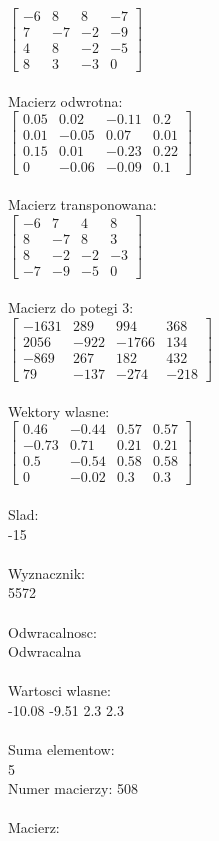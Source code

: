 \documentclass[a4paper,12pt]{article}
\begin{document}
$\begin{bmatrix} -6&8&8&-7\\7&-7&-2&-9\\4&8&-2&-5\\8&3&-3&0 \end{bmatrix}$
\\
\\
Macierz odwrotna:\\

$\begin{bmatrix} 0.05&0.02&-0.11&0.2\\0.01&-0.05&0.07&0.01\\0.15&0.01&-0.23&0.22\\0&-0.06&-0.09&0.1 \end{bmatrix}$
\\
\\
Macierz transponowana:\\

$\begin{bmatrix} -6&7&4&8\\8&-7&8&3\\8&-2&-2&-3\\-7&-9&-5&0 \end{bmatrix}$
\\
\\
Macierz do potegi 3:\\

$\begin{bmatrix} -1631&289&994&368\\2056&-922&-1766&134\\-869&267&182&432\\79&-137&-274&-218 \end{bmatrix}$
\\
\\
Wektory wlasne:\\

$\begin{bmatrix} 0.46&-0.44&0.57&0.57\\-0.73&0.71&0.21&0.21\\0.5&-0.54&0.58&0.58\\0&-0.02&0.3&0.3 \end{bmatrix}$
\\
\\
Slad:\\
-15
\\
\\
Wyznacznik:\\
5572
\\
\\
Odwracalnosc:\\
Odwracalna
\\
\\
Wartosci wlasne:\\
-10.08 -9.51 2.3 2.3
\\
\\
Suma elementow:\\
5
\\
\newpage
Numer macierzy:
508
\\
\\
Macierz:\\
\end{document}
